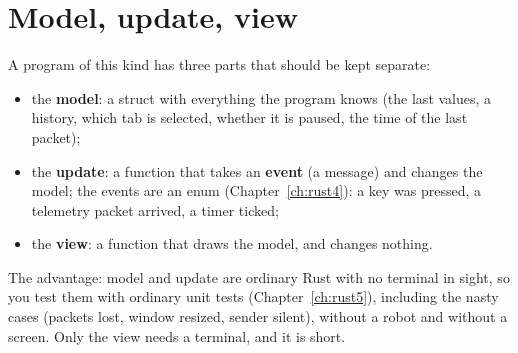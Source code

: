 \section*{Model, update, view}
A program of this kind has three parts that should be kept separate:
\begin{itemize}[nosep]
\item the \textbf{model}: a struct with everything the program knows (the last values, a history, which tab is selected, whether it is paused, the time of the last packet);
\item the \textbf{update}: a function that takes an \textbf{event} (a message) and changes the model; the events are an enum (Chapter~\ref{ch:rust4}): a key was pressed, a telemetry packet arrived, a timer ticked;
\item the \textbf{view}: a function that draws the model, and changes nothing.
\end{itemize}
The advantage: model and update are ordinary Rust with no terminal in sight, so you test them with ordinary unit tests (Chapter~\ref{ch:rust5}), including the nasty cases (packets lost, window resized, sender silent), without a robot and without a screen. Only the view needs a terminal, and it is short.
